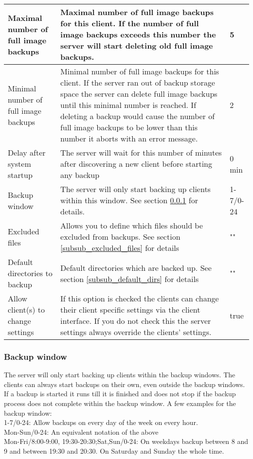 \documentclass[a4paper,10pt]{article}
\begin{document}
\begin{longtable}{|p{}|p{}|p{}|}
\hline
Maximal number of full image backups & Maximal number of full image backups for this client. If the number of
 full image backups exceeds this number the server will start deleting old full image backups. & 5\\
\hline
Minimal number of full image backups & Minimal number of full image backups for this client. If the server ran out of backup storage space the server can delete full image backups until this minimal number is reached. If deleting a backup would cause the number of full image backups to be lower than this number it aborts with an error message. & 2\\
\hline
Delay after system startup & The server will wait for this number of minutes after discovering a new client before starting any backup & 0 min\\
\hline
Backup window & The server will only start backing up clients within this window. See section \ref{subsub_backup_window} for details. & 1-7/0-24\\
\hline
Excluded files & Allows you to define which files should be excluded from backups. See section \ref{subsub_excluded_files} for details & "" \\
\hline
Default directories to backup & Default directories which are backed up. See section \ref{subsub_default_dirs} for details & ""\\
\hline
Allow client(s) to change settings & If this option is checked the clients can change their client specific settings via the client interface. If you do not check this the server settings always override the clients' settings. & true\\
\hline
\end{longtable}

\subsubsection{Backup window}
\label{subsub_backup_window}

The server will only start backing up clients within the backup windows. The clients can always start backups on their own, even outside the backup windows. If a backup is started it runs till it is finished and does not stop if the backup process does not complete within the backup window. A few examples for the backup window:\\
1-7/0-24: Allow backups on every day of the week on every hour.\\
Mon-Sun/0-24: An equivalent notation of the above\\
Mon-Fri/8:00-9:00, 19:30-20:30;Sat,Sun/0-24: On weekdays backup between 8 and 9 and between 19:30 and 20:30. On Saturday and Sunday the whole time.
\end{document}
